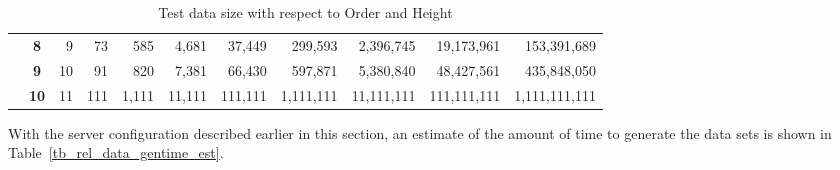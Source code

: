 \begin{table}[h]
\begin{tabular}{lc|r|r|r|r|r|r|r|r|r|}
\multicolumn{1}{|l}{\textbf{}} & \multicolumn{1}{|c|}{\textbf{8}} & 9 & 73 & 585 & 4,681 & 37,449 & 299,593 & 2,396,745 & 19,173,961 & 153,391,689 \\ \cline{2-11} 
\multicolumn{1}{|l}{\textbf{}} & \multicolumn{1}{|c|}{\textbf{9}} & 10 & 91 & 820 & 7,381 & 66,430 & 597,871 & 5,380,840 & 48,427,561 & 435,848,050 \\ \cline{2-11} 
\multicolumn{1}{|l}{\textbf{}} & \multicolumn{1}{|c|}{\textbf{10}} & 11 & 111 & 1,111 & 11,111 & 111,111 & 1,111,111 & 11,111,111 & 111,111,111 & 1,111,111,111 \\ \hline
\end{tabular}
\caption{Test data size with respect to Order and Height}
\label{tbl:reltree_data_size}
\end{table}

With the server configuration described earlier in this section, an estimate of the amount of time to generate the data sets is shown in Table~\ref{tb_rel_data_gentime_est}.

